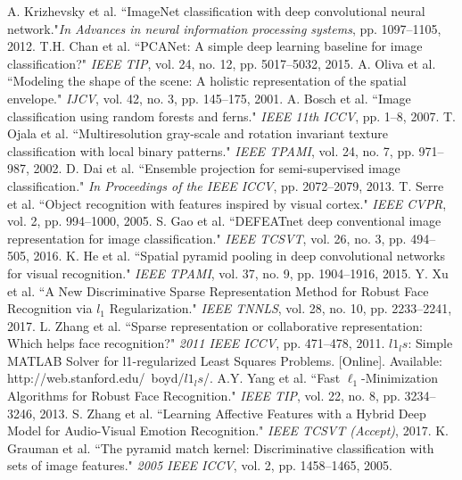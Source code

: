 \documentclass[journal]{IEEEtran}
\begin{document}
\begin{thebibliography}{1}
A. Krizhevsky et al. ``ImageNet classification with deep convolutional neural network."\emph{In Advances in neural information processing systems}, pp. 1097--1105, 2012.
T.H. Chan et al. ``PCANet: A simple deep learning baseline for image classification?" \emph{IEEE TIP}, vol. 24, no. 12, pp. 5017--5032, 2015.
A. Oliva et al. ``Modeling the shape of the scene: A holistic representation of the spatial envelope." \emph{IJCV}, vol. 42, no. 3, pp. 145--175, 2001.
A. Bosch et al. ``Image classification using random forests and ferns." \emph{IEEE 11th ICCV}, pp. 1--8, 2007.
T. Ojala et al. ``Multiresolution gray-scale and rotation invariant texture classification with local binary patterns." \emph{IEEE TPAMI}, vol. 24, no. 7, pp. 971--987, 2002.
D. Dai et al. ``Ensemble projection for semi-supervised image classification." \emph{In Proceedings of the IEEE ICCV}, pp. 2072--2079, 2013.
T. Serre et al. ``Object recognition with features inspired by visual cortex." \emph{IEEE CVPR}, vol. 2, pp. 994--1000, 2005.
S. Gao et al. ``DEFEATnet deep conventional image representation for image classification." \emph{IEEE TCSVT}, vol. 26, no. 3, pp. 494--505, 2016.
K. He et al. ``Spatial pyramid pooling in deep convolutional networks for visual recognition." \emph{IEEE TPAMI}, vol. 37, no. 9, pp. 1904--1916, 2015.
Y. Xu et al. ``A New Discriminative Sparse Representation Method for Robust Face Recognition via $l_1$ Regularization." \emph{IEEE TNNLS}, vol. 28, no. 10, pp. 2233--2241, 2017.
L. Zhang et al. ``Sparse representation or collaborative representation: Which helps face recognition?" \emph{2011 IEEE ICCV}, pp. 471--478, 2011.
$l1_ls$: Simple MATLAB Solver for l1-regularized Least Squares Problems. [Online]. Available:
http://web.stanford.edu/~boyd/$l1_ls$/.
A.Y. Yang et al. ``Fast $\ell_ {1} $-Minimization Algorithms for Robust Face Recognition." \emph{IEEE TIP}, vol. 22, no. 8, pp. 3234--3246, 2013.
S. Zhang et al. ``Learning Affective Features with a Hybrid Deep Model for Audio-Visual Emotion Recognition." \emph{IEEE TCSVT (Accept)},  2017.
K. Grauman et al. ``The pyramid match kernel: Discriminative classification with sets of image features." \emph{2005 IEEE ICCV}, vol. 2, pp. 1458--1465, 2005.

\end{thebibliography}
\end{document}
